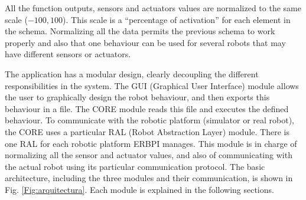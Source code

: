 
All the function outputs, sensors and actuators values are normalized to the same scale ($-100, 100$). This scale is a ``percentage of activation'' for each element in the schema. Normalizing all the data permits the previous schema to work properly and also that one behaviour can be used for several robots that may have different sensors or actuators. %


The application has a modular design, clearly decoupling the different responsibilities in the system. The GUI (Graphical User Interface) module allows the user to graphically design the robot behaviour, and then exports this behaviour in a file. The CORE module reads this file and executes the defined behaviour. To communicate with the robotic platform (simulator or real robot), the CORE uses a particular RAL (Robot Abstraction Layer) module. There is one RAL for each robotic platform ERBPI manages. This module is in charge of normalizing all the sensor and actuator values, and also of communicating with the actual robot using its particular communication protocol. The basic architecture, including the three modules and their communication, is shown in Fig. \ref{Fig:arquitectura}. Each module is explained in the following sections. 



